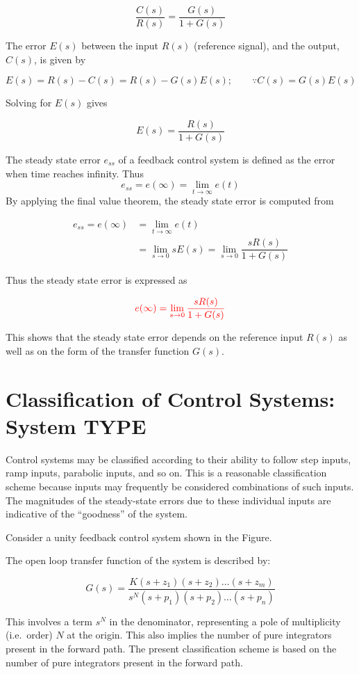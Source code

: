 \documentclass[
  14pt,
  a4paper,
  oneside,
  open=any,
  a4paper,
  14pt]{report}
\begin{document}
\[
    \dfrac{C(s)}{R(s)} = \dfrac{G(s)}{1+G(s)}
\]

The error \(E(s)\) between the input \(R(s)\) (reference signal), and
the output, \(C(s)\), is given by

\[
    E(s) = R(s) - C(s) = R(s) - G(s)E(s); \qquad \because C(s) = G(s)E(s)
\]

Solving for \(E(s)\) gives

\[
    E(s) = \dfrac{R(s)}{1+G(s)}
\]

The steady state error \(e_{ss}\) of a feedback control system is
defined as the error when time reaches infinity. Thus \[
    e_{ss} = e(\infty) = \lim_{t \to \infty} e(t)
\] By applying the final value theorem, the steady state error is
computed from

\[
\begin{aligned}
    e_{ss} = e(\infty) &= \lim_{t \to \infty} e(t) \\
    &= \lim_{s \to 0} sE(s) = \lim_{s \to 0} \dfrac{sR(s)}{1+G(s)}
\end{aligned}
\]

Thus the steady state error is expressed as

\[
    \textcolor{red}{e(\infty) = \lim_{s \to 0} \dfrac{sR(s)}{1+G(s)}}
\]

This shows that the steady state error depends on the reference input
\(R(s)\) as well as on the form of the transfer function \(G(s)\).

\section{Classification of Control Systems: System
TYPE}\label{classification-of-control-systems-system-type}

Control systems may be classified according to their ability to follow
step inputs, ramp inputs, parabolic inputs, and so on. This is a
reasonable classification scheme because inputs may frequently be
considered combinations of such inputs. The magnitudes of the
steady-state errors due to these individual inputs are indicative of the
``goodness'' of the system.

Consider a unity feedback control system shown in the Figure.

The open loop transfer function of the system is described by:

\[
    G(s) = \dfrac{K(s+z_1)(s+z_2) \ldots (s+z_m)}{s^N(s+p_1)(s+p_2) \ldots (s+p_n)}
\]

This involves a term \(s^N\) in the denominator, representing a pole of
multiplicity (i.e.~order) \(N\) at the origin. This also implies the
number of pure integrators present in the forward path. The present
classification scheme is based on the number of pure integrators present
in the forward path.
\end{document}
